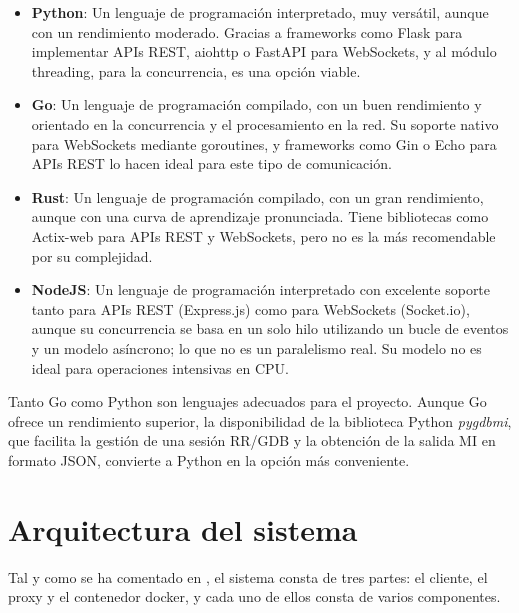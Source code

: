 \begin{itemize}
    \item \textbf{Python}: Un lenguaje de programación interpretado, muy versátil, aunque con un rendimiento moderado. Gracias a frameworks como Flask para implementar APIs REST, aiohttp o FastAPI para WebSockets, y al módulo threading, para la concurrencia, es una opción viable.
    \item \textbf{Go}: Un lenguaje de programación compilado, con un buen rendimiento y orientado en la concurrencia y el procesamiento en la red. Su soporte nativo para WebSockets mediante goroutines, y frameworks como Gin o Echo para APIs REST lo hacen ideal para este tipo de comunicación.
    \item \textbf{Rust}: Un lenguaje de programación compilado, con un gran rendimiento, aunque con una curva de aprendizaje pronunciada. Tiene bibliotecas como Actix-web para APIs REST y WebSockets, pero no es la más recomendable por su complejidad. 
    \item \textbf{NodeJS}: Un lenguaje de programación interpretado con excelente soporte tanto para APIs REST (Express.js) como para WebSockets (Socket.io), aunque su concurrencia se basa en un solo hilo utilizando un bucle de eventos y un modelo asíncrono; lo que no es un paralelismo real. Su modelo no es ideal para operaciones intensivas en CPU.
\end{itemize}

Tanto Go como Python son lenguajes adecuados para el proyecto. Aunque Go ofrece un rendimiento superior, la disponibilidad de la biblioteca Python \textit{pygdbmi}, que facilita la gestión de una sesión RR/GDB y la obtención de la salida MI en formato JSON, convierte a Python en la opción más conveniente.

\section{Arquitectura del sistema}\label{sec:arquitectura-sistema}

Tal y como se ha comentado en , el sistema consta de tres partes: el cliente, el proxy y el contenedor docker, y cada uno de ellos consta de varios componentes. 

